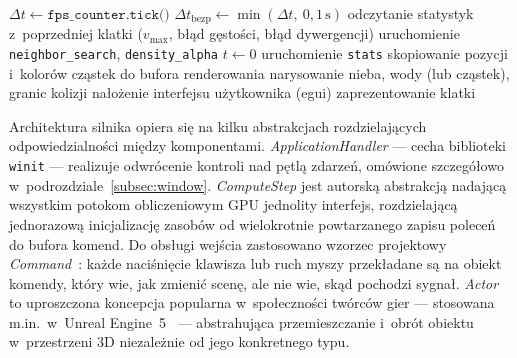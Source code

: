 \begin{algorithm}[htbp]
\caption{Pętla ramki}
\label{alg:frame_loop}
$\Delta t \leftarrow \texttt{fps\_counter.tick()}$\;
$\Delta t_{\text{bezp}} \leftarrow \min(\Delta t,\ 0{,}1\,\text{s})$\;
odczytanie statystyk z~poprzedniej klatki ($v_{\max}$, błąd gęstości, błąd dywergencji)\;
uruchomienie \texttt{neighbor\_search}, \texttt{density\_alpha}\;
$t \leftarrow 0$\;
uruchomienie \texttt{stats}\;
skopiowanie pozycji i~kolorów cząstek do bufora renderowania\;
narysowanie nieba, wody (lub cząstek), granic kolizji\;
nałożenie interfejsu użytkownika (egui)\;
zaprezentowanie klatki\;
\end{algorithm}

Architektura silnika opiera się na kilku abstrakcjach rozdzielających odpowiedzialności między komponentami.
\textit{ApplicationHandler} --- cecha biblioteki \texttt{winit} --- realizuje
odwrócenie kontroli nad pętlą zdarzeń, omówione szczegółowo
w~podrozdziale~\ref{subsec:window}.
\textit{ComputeStep} jest autorską abstrakcją nadającą wszystkim potokom
obliczeniowym GPU jednolity interfejs, rozdzielającą jednorazową inicjalizację
zasobów od wielokrotnie powtarzanego zapisu poleceń do bufora komend.
Do obsługi wejścia zastosowano wzorzec projektowy \textit{Command}~\cite{gamma1994design}:
każde naciśnięcie klawisza lub ruch myszy przekładane są na obiekt komendy,
który wie, jak zmienić scenę, ale nie wie, skąd pochodzi sygnał.
\textit{Actor} to uproszczona koncepcja popularna w~społeczności twórców gier
--- stosowana m.in.\ w~Unreal Engine~5~\cite{ue5fluids} ---
abstrahująca przemieszczanie i~obrót obiektu w~przestrzeni 3D niezależnie
od jego konkretnego typu.

